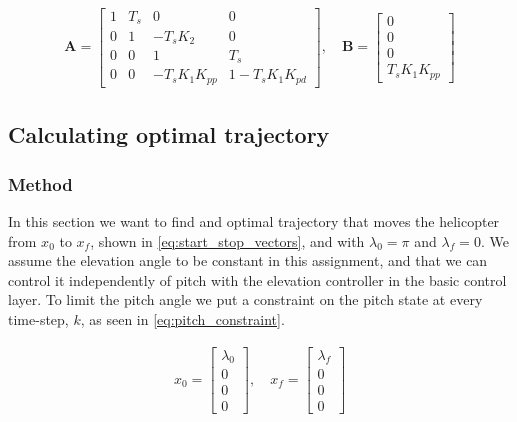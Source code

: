 \begin{equation}\label{eq:SS_disc}
    \begin{aligned}
        \mathbf{A} =
        \begin{bmatrix} 1 & T_s & 0 & 0 \\ 0 & 1 & -T_sK_2 & 0 \\ 0 & 0 & 1 & T_s \\ 0 & 0 & -T_sK_1K_{pp} & 1 -T_sK_1K_{pd} \end{bmatrix}, \quad
        \mathbf{B} = 
        \begin{bmatrix} 0 \\ 0 \\ 0 \\ T_sK_1K_{pp} \end{bmatrix}
    \end{aligned}
\end{equation}

\subsection{Calculating optimal trajectory}
\subsubsection{Method}
In this section we want to find and optimal trajectory that moves the helicopter from $x_0$ to $x_f$, shown in \cref{eq:start_stop_vectors}, and with $\lambda_0=\pi$ and $\lambda_f=0$. We assume the elevation angle to be constant in this assignment, and that we can control it independently of pitch with the elevation controller in the basic control layer. To limit the pitch angle we put a constraint on the pitch state at every time-step, $k$, as seen in \cref{eq:pitch_constraint}.

\begin{equation}\label{eq:start_stop_vectors}
    \begin{aligned}
        x_0 =
        \begin{bmatrix} \lambda_0 \\ 0 \\ 0 \\ 0 \end{bmatrix},
        \quad
        x_f =
        \begin{bmatrix} \lambda_f \\ 0 \\ 0 \\ 0 \end{bmatrix}
    \end{aligned}
\end{equation}

